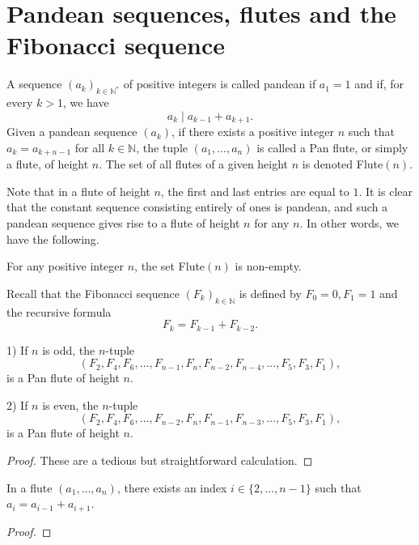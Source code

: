 
\chapter{Pandean sequences, flutes and the Fibonacci sequence}
\begin{definition}
    \label{def:pandean}
    A sequence $(a_k)_{k \in \mathbb{N}^*}$ of positive integers is called pandean if $a_1 = 1$ and 
    if, for every $k > 1$, we have
    \[
        a_k \mid a_{k-1} + a_{k+1}.
    \]
    Given a pandean sequence $(a_k)$, if there exists a positive integer $n$ such that $a_k = a_{k+n-1}$ for all $k\in \mathbb{N}$, 
    the tuple $(a_1, \ldots, a_n)$ is called a Pan flute, or simply a flute, of height $n$. The set of all flutes of a given height $n$ 
    is denoted Flute$(n)$.
\end{definition}
Note that in a flute of height $n$, the first and last entries are equal to $1$. It is clear that the constant sequence consisting 
entirely of ones is pandean, and such a pandean sequence gives rise to a flute of height $n$ for any $n$.
In other words, we have the following.
\begin{lemma}
    \label{l:kFluteNonEmpty}
    For any positive integer $n$, the set Flute$(n)$ is non-empty.
\end{lemma}
Recall that the Fibonacci sequence $(F_k)_{k \in \mathbb{N}}$ is defined by $F_0 = 0, F_1 = 1$ and the recursive formula
    \[
        F_k = F_{k-1} + F_{k-2}.
    \]


\begin{lemma}
    \label{l:FibFlute}
    1) If $n$ is odd, the $n$-tuple 
    \[
        (F_2,F_4, F_6, \ldots, F_{n-1}, F_{n}, F_{n-2}, F_{n-4}, \ldots, F_5, F_3, F_1), 
    \]
    is a Pan flute of height $n$.

    2) If $n$ is even, the $n$-tuple 
    \[
        (F_2, F_4, F_6, \ldots, F_{n-2}, F_{n}, F_{n-1}, F_{n-3}, \ldots, F_5, F_3,F_1),
    \]
    is a Pan flute of height $n$. 
\end{lemma}
\begin{proof}
    These are a tedious but straightforward calculation.
\end{proof}

\begin{lemma}
    \label{lem:FluteReduction}
    In a flute $(a_1, \ldots, a_n)$, there exists an index $i \in \{2,\ldots, n-1\}$ 
    such that $a_i = a_{i-1} + a_{i+1}$.
\end{lemma}
\begin{proof}

\end{proof}

